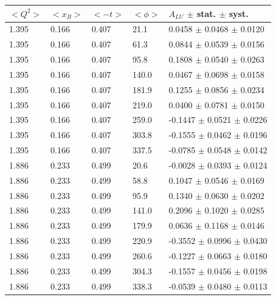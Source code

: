 \begin{table}[!h]
   \begin{center}
      \begin{tabular}{||l|l|l|l|l||}
         \hline
 $<Q^{2}>$ & $<x_{B}>$ & $<-t>$ & $<\phi>$ & $A_{LU}$ $\pm$ stat. $\pm$ syst.\\
 \hline 

   1.395 & 0.166 & 0.407  & 21.1  &  0.0458   $\pm$  0.0468   $\pm$   0.0120\\
   1.395 & 0.166 & 0.407  & 61.3  &  0.0844   $\pm$  0.0539   $\pm$   0.0156  \\
   1.395 & 0.166 & 0.407  & 95.8  &  0.1808   $\pm$  0.0540   $\pm$   0.0263  \\
   1.395 & 0.166 & 0.407  & 140.0 &  0.0467   $\pm$  0.0698   $\pm$   0.0158  \\
   1.395 & 0.166 & 0.407  & 181.9 &  0.1255   $\pm$  0.0856   $\pm$   0.0234  \\
   1.395 & 0.166 & 0.407  & 219.0 &  0.0400   $\pm$  0.0781   $\pm$   0.0150  \\
   1.395 & 0.166 & 0.407  & 259.0 & -0.1447   $\pm$  0.0521   $\pm$   0.0226  \\
   1.395 & 0.166 & 0.407  & 303.8 & -0.1555   $\pm$  0.0462   $\pm$   0.0196  \\
   1.395 & 0.166 & 0.407  & 337.5 & -0.0785   $\pm$  0.0548   $\pm$   0.0142  \\
  \hline                                                                        
   1.886 & 0.233 & 0.499  & 20.6  & -0.0028   $\pm$  0.0393   $\pm$   0.0124  \\
   1.886 & 0.233 & 0.499  & 58.8  &  0.1047   $\pm$  0.0546   $\pm$   0.0169  \\
   1.886 & 0.233 & 0.499  & 95.9  &  0.1340   $\pm$  0.0630   $\pm$   0.0202  \\
   1.886 & 0.233 & 0.499  & 141.0 &  0.2096   $\pm$  0.1020   $\pm$   0.0285  \\
   1.886 & 0.233 & 0.499  & 179.9 &  0.0636   $\pm$  0.1168   $\pm$   0.0146  \\
   1.886 & 0.233 & 0.499  & 220.9 & -0.3552   $\pm$  0.0996   $\pm$   0.0430  \\
   1.886 & 0.233 & 0.499  & 260.6 & -0.1227   $\pm$  0.0663   $\pm$   0.0180  \\
   1.886 & 0.233 & 0.499  & 304.3 & -0.1557   $\pm$  0.0456   $\pm$   0.0198  \\
   1.886 & 0.233 & 0.499  & 338.3 & -0.0539   $\pm$  0.0480   $\pm$   0.0113  \\

\end{tabular}
\end{center}
\end{table}
